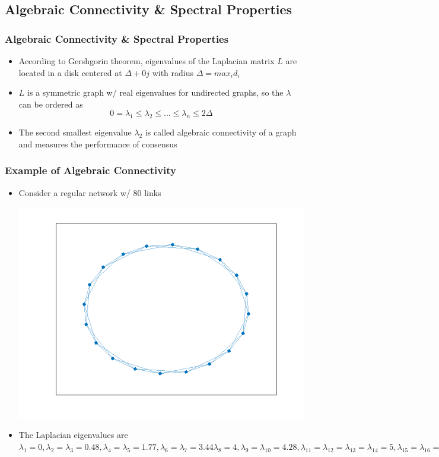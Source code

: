\documentclass{beamer}
\begin{document}
\subsection{Algebraic Connectivity \& Spectral Properties}

\begin{frame}
\frametitle{Algebraic Connectivity \& Spectral Properties}
\begin{itemize}
\item According to Gershgorin theorem, eigenvalues of the Laplacian matrix $L$ are located in a disk centered at $\Delta + 0j$ with radius $\Delta=max_i d_i$
\item $L$ is a symmetric graph w/ real eigenvalues for undirected graphs, so the $\lambda$ can be ordered as
\begin{equation*}
0=\lambda_1 \leq \lambda_2 \leq ... \leq \lambda_n \leq 2\Delta
\end{equation*}  
\item The second smallest eigenvalue $\lambda_2$ is called algebraic connectivity of a graph and measures the performance of consensus 
\end{itemize}
\end{frame}


\begin{frame}
\frametitle{Example of Algebraic Connectivity}
 
\begin{itemize}
\item Consider a regular network w/ 80 links
\begin{center}
 \includegraphics[width=.35\textwidth]{figures/Regular80links.png}
\end{center}
\item The Laplacian eigenvalues are
$\lambda_1=0, \lambda_2=\lambda_3=0.48, \lambda_4=\lambda_5=1.77,\lambda_6=\lambda_7=3.44
\lambda_8=4,\lambda_9=\lambda_{10}=4.28,\lambda_{11}=\lambda_{12}=\lambda_{13}=\lambda_{14}=5,\lambda_{15}=\lambda_{16}=5.79,\lambda_{17}=\lambda_{18}=6,\lambda_{19}=\lambda_{20}=6.24\leq 2\Delta=8$
\end{itemize}
\end{frame}
\end{document}
